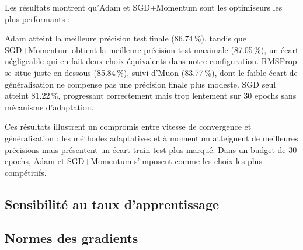 \documentclass[12pt]{article}
\begin{document}
  \begin{table}[H]
    \centering
    \caption{Résumé des performances finales des cinq optimiseurs après 30 époques}
    \label{tab:optimizer-summary}
  \end{table}

Les résultats montrent qu'Adam et SGD+Momentum sont les optimiseurs les plus
performants : 

Adam atteint la meilleure précision test finale (86.74\,\%),
tandis que SGD+Momentum obtient la meilleure précision test maximale (87.05\,\%),
un écart négligeable qui en fait deux choix équivalents dans notre configuration.
RMSProp se situe juste en dessous (85.84\,\%), suivi d'Muon (83.77\,\%), dont
le faible écart de généralisation ne compense pas une précision finale plus
modeste. SGD seul atteint 81.22\,\%, progressant correctement mais trop
lentement sur 30 epochs sans mécanisme d'adaptation.

Ces résultats illustrent un compromis entre vitesse de convergence et
généralisation : les méthodes adaptatives et à momentum atteignent de meilleures
précisions mais présentent un écart train-test plus marqué. Dans un budget de
30 epochs, Adam et SGD+Momentum s'imposent comme les choix les plus compétitifs.
\subsection{Sensibilité au taux d'apprentissage}


\subsection{Normes des gradients}
\end{document}
